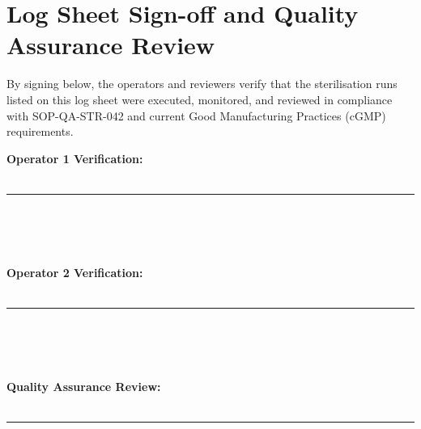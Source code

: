 
\section{Log Sheet Sign-off and Quality Assurance Review}

By signing below, the operators and reviewers verify that the sterilisation runs listed on this log sheet were executed, monitored, and reviewed in compliance with SOP-QA-STR-042 and current Good Manufacturing Practices (cGMP) requirements.

\vspace{1.5em}

\begin{minipage}[t]{0.31\textwidth}
  \vspace{0pt}
  \textbf{Operator 1 Verification:} \\
  \vspace{1.8em} \\
  \rule{\textwidth}{0.5pt} \\
    \\
    \\
   
\end{minipage}
\hfill
\begin{minipage}[t]{0.31\textwidth}
  \vspace{0pt}
  \textbf{Operator 2 Verification:} \\
  \vspace{1.8em} \\
  \rule{\textwidth}{0.5pt} \\
    \\
    \\
   
\end{minipage}
\hfill
\begin{minipage}[t]{0.31\textwidth}
  \vspace{0pt}
  \textbf{Quality Assurance Review:} \\
  \vspace{1.8em} \\
  \rule{\textwidth}{0.5pt} \\
    \textbar\  \\
    \\
   
\end{minipage}
\par
